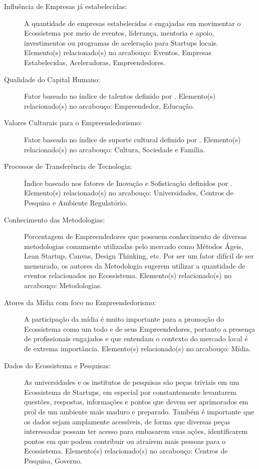 \begin{description}
  \item [Influência de Empresas já estabelecidas:] A quantidade de empresas estabelecidas e engajadas em movimentar o Ecossistema por meio de eventos, líderança, mentoria e apoio, investimentos ou programas de aceleração para Startups locais. Elemento(s) relacionado(s) no arcabouço: Eventos, Empresas Estabelecidas, Aceleradoras, Empreendedores.

  \item [Qualidade do Capital Humano:] Fator baseado no índice de talentos definido por . Elemento(s) relacionado(s) no arcabouço: Empreendedor, Educação.

  \item [Valores Culturais para o Empreendedorismo:] Fator baseado no índice de suporte cultural definido por . Elemento(s) relacionado(s) no arcabouço: Cultura, Sociedade e Família.

  \item [Processos de Transferência de Tecnologia:] Índice baseado nos fatores de Inovação e Sofisticação definidos por . Elemento(s) relacionado(s) no arcabouço: Universidades, Centros de Pesquisa e Ambiente Regulatório.

  \item [Conhecimento das Metodologias:] Porcentagem de Empreendedores que possuem conhecimento de diversas metodologias comumente utilizadas pelo mercado como Métodos Ágeis, Lean Startup, Canvas, Design Thinking, etc. Por ser um fator difícil de ser mensurado, os autores da Metodologia sugerem utilizar a quantidade de eventos relacionados no Ecossistema. Elemento(s) relacionado(s) no arcabouço: Metodologias.

  \item [Atores da Mídia com foco no Empreendedorismo:] A participação da mídia é muito importante para a promoção do Ecossistema como um todo e de seus Empreendedores, portanto a presença de profissionais engajados e que entendam o contexto do mercado local é de extrema importância. Elemento(s) relacionado(s) no arcabouço: Mídia.

  \item [Dados do Ecossistema e Pesquisas:] As universidades e os institutos de pesquisas são peças triviais em um Ecossistema de Startups, em especial por constantemente levantarem questões, respostas, informações e pontos que devem ser aprimorados em prol de um ambiente mais maduro e preparado. Também é importante que os dados sejam amplamente acessíveis, de forma que diversas peças interessadas possam ter acesso para embasarem suas ações, identificarem pontos em que podem contribuir ou atraírem mais pessoas para o Ecossistema. Elemento(s) relacionado(s) no arcabouço: Centros de Pesquisa, Governo.
  

\end{description}
